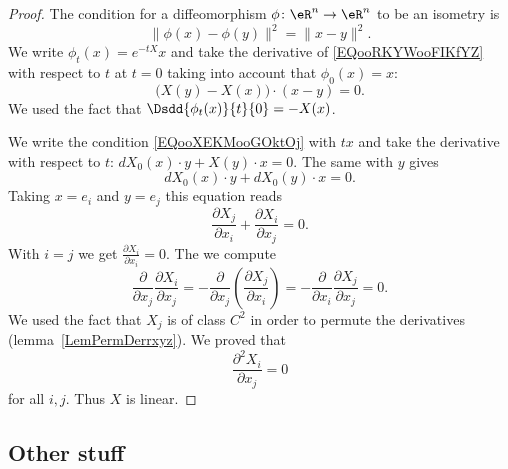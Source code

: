 \begin{proof}
	The condition for a diffeomorphism \( \phi\colon \eR^n\to \eR^n\) to be an isometry is
	\begin{equation}        \label{EQooRKYWooFIKfYZ}
		\| \phi(x)- \phi(y) \|^2=\| x-y \|^2.
	\end{equation}
	We write \( \phi_t(x)= e^{-tX}x\) and take the derivative of \eqref{EQooRKYWooFIKfYZ} with respect to \( t\) at \( t=0\) taking into account that \( \phi_0(x)=x\):
	\begin{equation}        \label{EQooXEKMooGOktOj}
		\big( X(y)-X(x) \big)\cdot (x-y)=0.
	\end{equation}
	We used the fact that \( \Dsdd{ \phi_t(x) }{t}{0}=-X(x)\).

	We write the condition \eqref{EQooXEKMooGOktOj} with \( tx\) and take the derivative with respect to \( t\): \( dX_0(x)\cdot y+X(y)\cdot x=0\). The same with \( y\) gives
	\begin{equation}
		dX_0(x)\cdot y+dX_0(y)\cdot x=0.
	\end{equation}
	Taking \( x=e_i\) and \( y=e_j\) this equation reads
	\begin{equation}
		\frac{ \partial X_j }{ \partial x_i }+\frac{ \partial X_i }{ \partial x_j }=0.
	\end{equation}
	With \( i=j\) we get \( \frac{ \partial X_i }{ \partial x_i }=0\). The we compute
	\begin{equation}
		\frac{ \partial  }{ \partial x_j }\frac{ \partial X_i }{ \partial x_j }=-\frac{ \partial  }{ \partial x_j }\left( \frac{ \partial X_j }{ \partial x_i } \right)=-\frac{ \partial  }{ \partial x_i }\frac{ \partial X_j }{ \partial x_j }=0.
	\end{equation}
	We used the fact that \( X_j\) is of class \( C^2\) in order to permute the derivatives (lemma~\ref{LemPermDerrxyz}). We proved that
	\begin{equation}
		\frac{ \partial^2 X_i  }{ \partial x_j }=0
	\end{equation}
	for all \( i,j\). Thus \( X\) is linear.
\end{proof}

\subsection{Other stuff}



